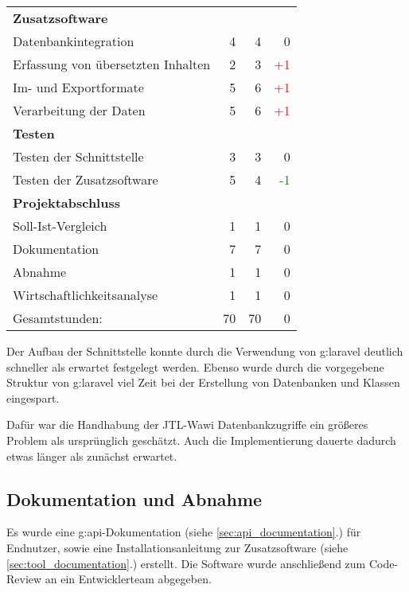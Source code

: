 \begin{center}
\begin{tabular}{ |l|r|r|r| }
        \hspace{0.65cm} \textbf{Zusatzsoftware} & & & \\
        \hspace{1.3cm} Datenbankintegration & 4 & 4 & 0\\
        \hspace{1.3cm} Erfassung von übersetzten Inhalten & 2 & 3 & \textcolor{red}{+1} \\
        \hspace{1.3cm} Im- und Exportformate & 5 & 6 & \textcolor{red}{+1}\\
        \hspace{1.3cm} Verarbeitung der Daten & 5 & 6 & \textcolor{red}{+1}\\
        \hline  
        \textbf{Testen} & & & \\
        \hspace{0.65cm} Testen der Schnittstelle & 3 & 3 & 0\\
        \hspace{0.65cm} Testen der Zusatzsoftware & 5 & 4 & \textcolor{Green}{-1} \\
        \hline  
        \textbf{Projektabschluss} & & & \\
        \hspace{0.65cm} Soll-Ist-Vergleich & 1 & 1 & 0\\
        \hspace{0.65cm} Dokumentation & 7 & 7 & 0\\
        \hspace{0.65cm} Abnahme & 1 & 1 & 0\\
        \hspace{0.65cm} Wirtschaftlichkeitsanalyse & 1 & 1 & 0\\
        \hline
        Gesamtstunden: & 70 & 70 & 0\\
        \hline
    \end{tabular}
\end{center}
Der Aufbau der Schnittstelle konnte durch die Verwendung von \gls{g:laravel} deutlich schneller als erwartet festgelegt werden. 
Ebenso wurde durch die vorgegebene Struktur von \gls{g:laravel} viel Zeit bei der Erstellung von Datenbanken und Klassen eingespart.

Dafür war die Handhabung der JTL-Wawi Datenbankzugriffe ein größeres Problem als ursprünglich geschätzt. 
Auch die Implementierung dauerte dadurch etwas länger als zunächst erwartet. 

\subsection{Dokumentation und Abnahme}
Es wurde eine \gls{g:api}-Dokumentation (siehe \ref{sec:api_documentation}.) für Endnutzer, sowie eine Installationsanleitung zur Zusatzsoftware (siehe \ref{sec:tool_documentation}.) erstellt. 
Die Software wurde anschließend zum Code-Review an ein Entwicklerteam abgegeben.

